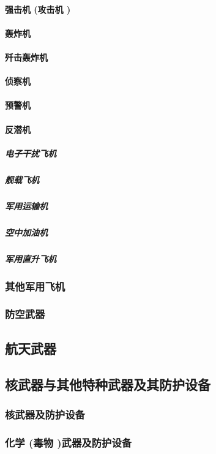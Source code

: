 \documentclass[UTF8]{../ApplicationUniverse}
\begin{document}
            \paragraph{强击机 (攻击机 )}
            \paragraph{轰炸机}
            \paragraph{歼击轰炸机}
            \paragraph{侦察机}
            \paragraph{预警机}
            \paragraph{反潜机}
                \subparagraph{电子干扰飞机}
                \subparagraph{舰载飞机}
                \subparagraph{军用运输机}
                \subparagraph{空中加油机}
                \subparagraph{军用直升飞机}
            \subsubsection{其他军用飞机}
        \subsubsection{防空武器}
    \subsection{航天武器}

    \subsection{核武器与其他特种武器及其防护设备}
        \subsubsection{核武器及防护设备}
        \subsubsection{化学 (毒物 )武器及防护设备}
\end{document}
